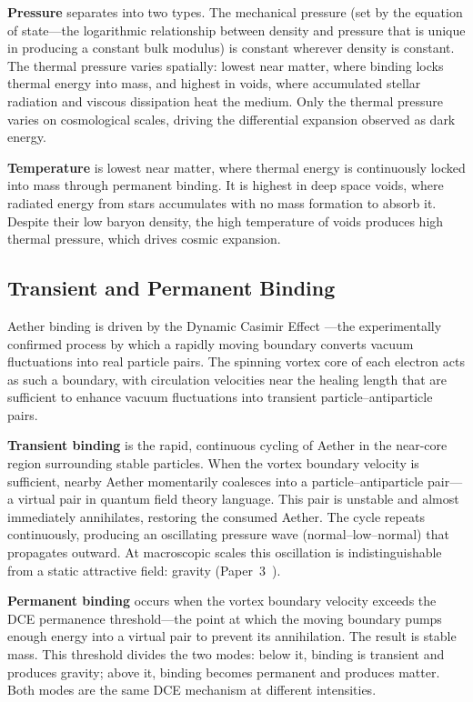 \documentclass[12pt,letterpaper]{article}
\begin{document}
\textbf{Pressure} separates into two types.  The mechanical pressure (set by the
equation of state---the logarithmic relationship between density and pressure
that is unique in producing a constant bulk modulus) is constant wherever
density is constant.  The thermal pressure
varies spatially: lowest near matter, where binding locks thermal energy into mass,
and highest in voids, where accumulated stellar radiation and viscous dissipation heat
the medium.  Only the thermal pressure varies on cosmological scales, driving the
differential expansion observed as dark energy.

\textbf{Temperature} is lowest near matter, where thermal energy is continuously
locked into mass through permanent binding.  It is highest in deep space voids, where
radiated energy from stars accumulates with no mass formation to absorb it.  Despite
their low baryon density, the high temperature of voids produces high thermal pressure,
which drives cosmic expansion.


\subsection{Transient and Permanent Binding}

Aether binding is driven by the Dynamic Casimir Effect \cite{wilson2011}---the
experimentally confirmed process by which a rapidly moving boundary converts
vacuum fluctuations into real particle pairs.  The spinning vortex core of each
electron acts as such a boundary, with circulation velocities near the healing
length that are sufficient to enhance vacuum fluctuations into transient
particle--antiparticle pairs.

\textbf{Transient binding} is the rapid, continuous cycling of Aether in the
near-core region surrounding stable particles.  When the vortex boundary velocity
is sufficient, nearby Aether momentarily coalesces into a particle--antiparticle
pair---a virtual pair in quantum field theory language.  This pair is unstable
and almost immediately annihilates, restoring the consumed Aether.  The cycle
repeats continuously, producing an oscillating pressure wave (normal--low--normal)
that propagates outward.  At macroscopic scales this oscillation is
indistinguishable from a static attractive field: gravity
(Paper~3~\cite{otto-gravity}).

\textbf{Permanent binding} occurs when the vortex boundary velocity exceeds
the DCE permanence threshold---the point at which the moving boundary pumps
enough energy into a virtual pair to prevent its annihilation.  The result is
stable mass.  This threshold divides the two modes: below it, binding is
transient and produces gravity; above it, binding becomes permanent and produces
matter.  Both modes are the same DCE mechanism at different intensities.
\end{document}
